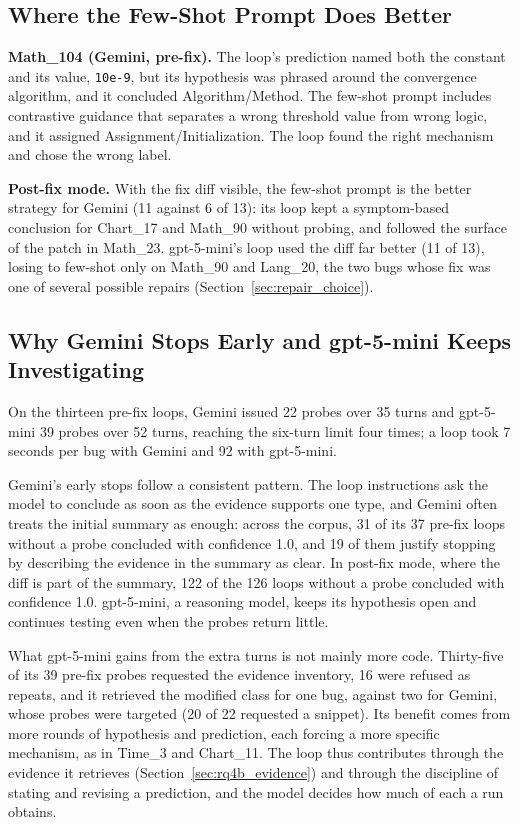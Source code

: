 \documentclass{iutbscthesis}
\begin{document}
\subsection{Where the Few-Shot Prompt Does Better}

\textbf{Math\_104 (Gemini, pre-fix).} The loop's prediction named both the constant and its value, \texttt{10e-9}, but its hypothesis was phrased around the convergence algorithm, and it concluded Algorithm/\allowbreak Method. The few-shot prompt includes contrastive guidance that separates a wrong threshold value from wrong logic, and it assigned Assignment/\allowbreak Initialization. The loop found the right mechanism and chose the wrong label.

\textbf{Post-fix mode.} With the fix diff visible, the few-shot prompt is the better strategy for Gemini (11 against 6 of 13): its loop kept a symptom-based conclusion for Chart\_17 and Math\_90 without probing, and followed the surface of the patch in Math\_23. gpt-5-mini's loop used the diff far better (11 of 13), losing to few-shot only on Math\_90 and Lang\_20, the two bugs whose fix was one of several possible repairs (Section~\ref{sec:repair_choice}).

\subsection{Why Gemini Stops Early and gpt-5-mini Keeps Investigating}

On the thirteen pre-fix loops, Gemini issued 22 probes over 35 turns and gpt-5-mini 39 probes over 52 turns, reaching the six-turn limit four times; a loop took 7 seconds per bug with Gemini and 92 with gpt-5-mini.

Gemini's early stops follow a consistent pattern. The loop instructions ask the model to conclude as soon as the evidence supports one type, and Gemini often treats the initial summary as enough: across the corpus, 31 of its 37 pre-fix loops without a probe concluded with confidence 1.0, and 19 of them justify stopping by describing the evidence in the summary as clear. In post-fix mode, where the diff is part of the summary, 122 of the 126 loops without a probe concluded with confidence 1.0. gpt-5-mini, a reasoning model, keeps its hypothesis open and continues testing even when the probes return little.

What gpt-5-mini gains from the extra turns is not mainly more code. Thirty-five of its 39 pre-fix probes requested the evidence inventory, 16 were refused as repeats, and it retrieved the modified class for one bug, against two for Gemini, whose probes were targeted (20 of 22 requested a snippet). Its benefit comes from more rounds of hypothesis and prediction, each forcing a more specific mechanism, as in Time\_3 and Chart\_11. The loop thus contributes through the evidence it retrieves (Section~\ref{sec:rq4b_evidence}) and through the discipline of stating and revising a prediction, and the model decides how much of each a run obtains.
\end{document}
